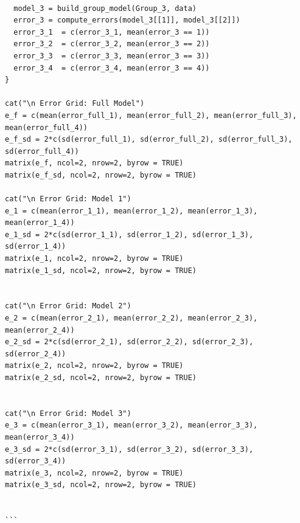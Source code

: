 \documentclass[12pt]{article}
\begin{document}
{\begin{verbatim}
  
  model_3 = build_group_model(Group_3, data)
  error_3 = compute_errors(model_3[[1]], model_3[[2]])
  error_3_1  = c(error_3_1, mean(error_3 == 1))
  error_3_2  = c(error_3_2, mean(error_3 == 2))
  error_3_3  = c(error_3_3, mean(error_3 == 3))
  error_3_4  = c(error_3_4, mean(error_3 == 4))
}

cat("\n Error Grid: Full Model")
e_f = c(mean(error_full_1), mean(error_full_2), mean(error_full_3), mean(error_full_4))
e_f_sd = 2*c(sd(error_full_1), sd(error_full_2), sd(error_full_3), sd(error_full_4))
matrix(e_f, ncol=2, nrow=2, byrow = TRUE)
matrix(e_f_sd, ncol=2, nrow=2, byrow = TRUE)

cat("\n Error Grid: Model 1")
e_1 = c(mean(error_1_1), mean(error_1_2), mean(error_1_3), mean(error_1_4))
e_1_sd = 2*c(sd(error_1_1), sd(error_1_2), sd(error_1_3), sd(error_1_4))
matrix(e_1, ncol=2, nrow=2, byrow = TRUE)
matrix(e_1_sd, ncol=2, nrow=2, byrow = TRUE)


cat("\n Error Grid: Model 2")
e_2 = c(mean(error_2_1), mean(error_2_2), mean(error_2_3), mean(error_2_4))
e_2_sd = 2*c(sd(error_2_1), sd(error_2_2), sd(error_2_3), sd(error_2_4))
matrix(e_2, ncol=2, nrow=2, byrow = TRUE)
matrix(e_2_sd, ncol=2, nrow=2, byrow = TRUE)


cat("\n Error Grid: Model 3")
e_3 = c(mean(error_3_1), mean(error_3_2), mean(error_3_3), mean(error_3_4))
e_3_sd = 2*c(sd(error_3_1), sd(error_3_2), sd(error_3_3), sd(error_3_4))
matrix(e_3, ncol=2, nrow=2, byrow = TRUE)
matrix(e_3_sd, ncol=2, nrow=2, byrow = TRUE)


```

\end{verbatim} }
\end{document}
